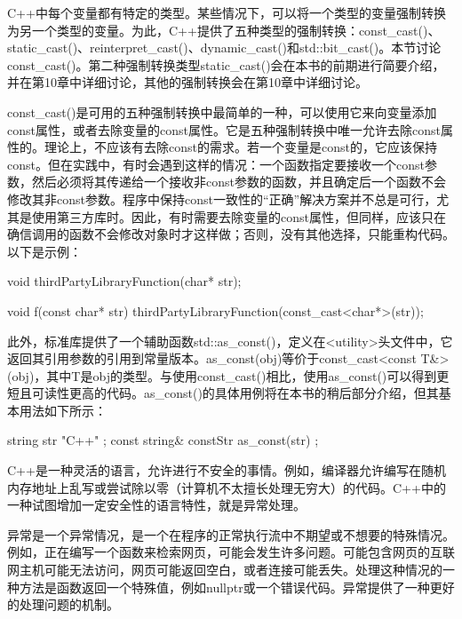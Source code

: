 
C++中每个变量都有特定的类型。某些情况下，可以将一个类型的变量强制转换为另一个类型的变量。为此，C++提供了五种类型的强制转换：const\_cast()、static\_cast()、reinterpret\_cast()、dynamic\_cast()和std::bit\_cast()。本节讨论const\_cast()。第二种强制转换类型static\_cast()会在本书的前期进行简要介绍，并在第10章中详细讨论，其他的强制转换会在第10章中详细讨论。

const\_cast()是可用的五种强制转换中最简单的一种，可以使用它来向变量添加const属性，或者去除变量的const属性。它是五种强制转换中唯一允许去除const属性的。理论上，不应该有去除const的需求。若一个变量是const的，它应该保持const。但在实践中，有时会遇到这样的情况：一个函数指定要接收一个const参数，然后必须将其传递给一个接收非const参数的函数，并且确定后一个函数不会修改其非const参数。程序中保持const一致性的“正确”解决方案并不总是可行，尤其是使用第三方库时。因此，有时需要去除变量的const属性，但同样，应该只在确信调用的函数不会修改对象时才这样做；否则，没有其他选择，只能重构代码。以下是示例：

\begin{cpp}
void thirdPartyLibraryFunction(char* str);

void f(const char* str)
{
    thirdPartyLibraryFunction(const_cast<char*>(str));
}
\end{cpp}

此外，标准库提供了一个辅助函数std::as\_const()，定义在<utility>头文件中，它返回其引用参数的引用到常量版本。as\_const(obj)等价于const\_cast<const T\&>(obj)，其中T是obj的类型。与使用const\_cast()相比，使用as\_const()可以得到更短且可读性更高的代码。as\_const()的具体用例将在本书的稍后部分介绍，但其基本用法如下所示：

\begin{cpp}
string str { "C++" };
const string& constStr { as_const(str) };
\end{cpp}


C++是一种灵活的语言，允许进行不安全的事情。例如，编译器允许编写在随机内存地址上乱写或尝试除以零（计算机不太擅长处理无穷大）的代码。C++中的一种试图增加一定安全性的语言特性，就是异常处理。

异常是一个异常情况，是一个在程序的正常执行流中不期望或不想要的特殊情况。例如，正在编写一个函数来检索网页，可能会发生许多问题。可能包含网页的互联网主机可能无法访问，网页可能返回空白，或者连接可能丢失。处理这种情况的一种方法是函数返回一个特殊值，例如nullptr或一个错误代码。异常提供了一种更好的处理问题的机制。

